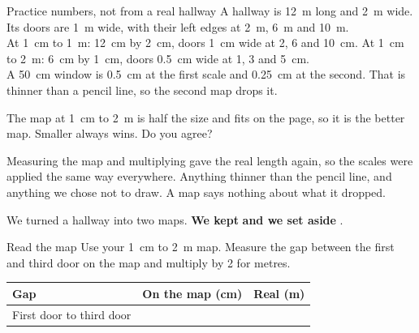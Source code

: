 \begin{worked}{Practice numbers, not from a real hallway}
A hallway is 12~m long and 2~m wide. Its doors are 1~m wide, with their left edges at 2~m, 6~m and 10~m.\\
At 1~cm to 1~m: 12~cm by 2~cm, doors 1~cm wide at 2, 6 and 10~cm. At 1~cm to 2~m: 6~cm by 1~cm, doors 0.5~cm wide at 1, 3 and 5~cm.\\
A 50~cm window is 0.5~cm at the first scale and 0.25~cm at the second. That is thinner than a pencil line, so the second map drops it.
\end{worked}

\begin{center}
\end{center}

\begin{multix}[hmm]\multixbot[hmm]\tcblower
The map at 1~cm to 2~m is half the size and fits on the page, so it is the better map. Smaller always wins. Do you agree?
\end{multix}

{Measuring the map and multiplying gave the real length again, so the scales were applied the same way everywhere.}
{Anything thinner than the pencil line, and anything we chose not to draw. A map says nothing about what it dropped.}

\begin{keepbox}
We turned a hallway into two maps. \textbf{We kept} \wline[3.4cm] \textbf{and we set aside} \wline[3.4cm].
\end{keepbox}

\begin{tryit}{Read the map}
Use your 1~cm to 2~m map. Measure the gap between the first and third door on the map and multiply by 2 for metres.\par\medskip
\renewcommand{\arraystretch}{1.6}
\begin{tabular}{|l|c|c|}
\hline
\textbf{Gap} & \textbf{On the map (cm)} & \textbf{Real (m)}\\ \hline
First door to third door & & \\ \hline
\end{tabular}
\end{tryit}

